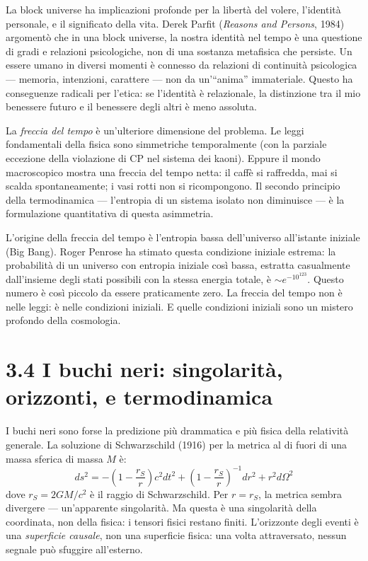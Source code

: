 \documentclass[11.5pt,a4paper,openany]{book}
\theoremstyle{remark}
\begin{document}
La block universe ha implicazioni profonde per la libertà del volere, l'identità personale, e il significato della vita. Derek Parfit (\textit{Reasons and Persons}, 1984) argomentò che in una block universe, la nostra identità nel tempo è una questione di gradi e relazioni psicologiche, non di una sostanza metafisica che persiste. Un essere umano in diversi momenti è connesso da relazioni di continuità psicologica --- memoria, intenzioni, carattere --- non da un'``anima'' immateriale. Questo ha conseguenze radicali per l'etica: se l'identità è relazionale, la distinzione tra il mio benessere futuro e il benessere degli altri è meno assoluta.

La \textit{freccia del tempo} è un'ulteriore dimensione del problema. Le leggi fondamentali della fisica sono simmetriche temporalmente (con la parziale eccezione della violazione di CP nel sistema dei kaoni). Eppure il mondo macroscopico mostra una freccia del tempo netta: il caffè si raffredda, mai si scalda spontaneamente; i vasi rotti non si ricompongono. Il secondo principio della termodinamica --- l'entropia di un sistema isolato non diminuisce --- è la formulazione quantitativa di questa asimmetria.

L'origine della freccia del tempo è l'entropia bassa dell'universo all'istante iniziale (Big Bang). Roger Penrose ha stimato questa condizione iniziale estrema: la probabilità di un universo con entropia iniziale così bassa, estratta casualmente dall'insieme degli stati possibili con la stessa energia totale, è $\sim e^{-10^{123}}$. Questo numero è così piccolo da essere praticamente zero. La freccia del tempo non è nelle leggi: è nelle condizioni iniziali. E quelle condizioni iniziali sono un mistero profondo della cosmologia.

\section{3.4 I buchi neri: singolarità, orizzonti, e termodinamica}

I buchi neri sono forse la predizione più drammatica e più fisica della relatività generale. La soluzione di Schwarzschild (1916) per la metrica al di fuori di una massa sferica di massa $M$ è:
\[
ds^2 = -\left(1-\frac{r_S}{r}\right)c^2 dt^2 + \left(1-\frac{r_S}{r}\right)^{-1}dr^2 + r^2 d\Omega^2
\]
dove $r_S = 2GM/c^2$ è il raggio di Schwarzschild. Per $r = r_S$, la metrica sembra divergere --- un'apparente singolarità. Ma questa è una singolarità della coordinata, non della fisica: i tensori fisici restano finiti. L'orizzonte degli eventi è una \textit{superficie causale}, non una superficie fisica: una volta attraversato, nessun segnale può sfuggire all'esterno.
\end{document}
